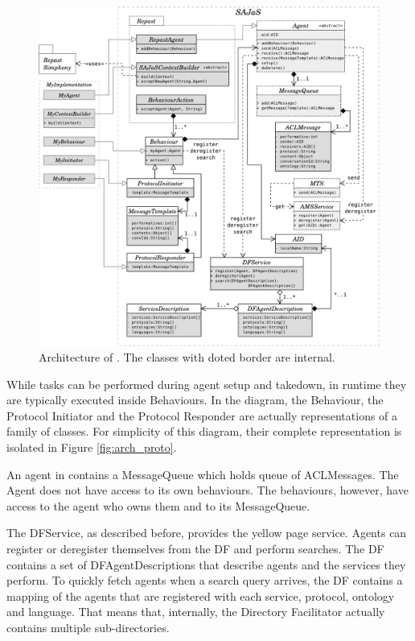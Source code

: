 \begin{figure}[h]
	\centering
	\includegraphics[width=\linewidth]{figures/sajas_arch.pdf}
	\caption{Architecture of \apiname{}. The classes with doted border are internal.}
	\label{fig:arch}
\end{figure}

While tasks can be performed during agent setup and takedown, in runtime they are typically executed inside Behaviours. In the diagram, the Behaviour, the Protocol Initiator and the Protocol Responder are actually representations of a family of classes. For simplicity of this diagram, their complete representation is isolated in Figure \ref{fig:arch_proto}.

An agent in \apiname{} contains a MessageQueue which holds queue of ACLMessages. The Agent does not have access to its own behaviours. The behaviours, however, have access to the agent who owns them and to its MessageQueue.

The DFService, as described before, provides the yellow page service. Agents can register or deregister themselves from the DF and perform searches. The DF contains a set of DFAgentDescriptions that describe agents and the services they perform. To quickly fetch agents when a search query arrives, the DF contains a mapping of the agents that are registered with each service, protocol, ontology and language. That means that, internally, the Directory Facilitator actually contains multiple sub-directories.

